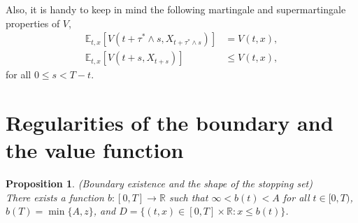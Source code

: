\documentclass{tufte-handout}
\newcommand{\E}{\mathbb{E}} %
\newtheorem{pr}{Proposition}
\begin{document}
	Also, it is handy to keep in mind the following martingale and supermartingale properties of $V$,
	\begin{align}
	\E_{t, x}\left[V(t + \tau^*\wedge s, X_{t + \tau^*\wedge s})\right] &=  V(t, x), \label{eq:V_martingale} \\
	\E_{t, x}\left[V(t + s, X_{t + s})\right] &\leq V(t, x), \label{eq:V_supermartingale}
	\end{align}	
	for all $0 \leq s < T - t.$
				
	\section{Regularities of the boundary and the value function}
	
	\begin{pr}\label{pr:boundary_existence}(Boundary existence and the shape of the stopping set)\\
		There exists a function $b:[0, T]\rightarrow\mathbb{R}$ such that $\infty < b(t) < A$ for all $t\in[0, T)$, $b(T) = \min\{A, z\}$, and $D = \{(t, x)\in[0, T]\times\mathbb{R} : x \leq b(t)\}$.
	\end{pr}
	
\end{document}
